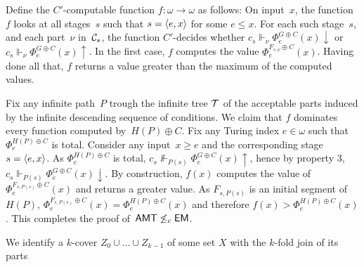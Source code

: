 Define the $C'$-computable function $f : \omega \to \omega$ as follows:
On input~$x$, the function~$f$ looks at all stages~$s$ such that $s = \left\langle e,x \right\rangle$ for
some $e \leq x$. For each such stage~$s$, and each part~$\nu$ in~$\mathcal{C}_s$,
the function $C'$-decides whether $c_s \Vdash_\nu \Phi^{G \oplus C}_e(x) \downarrow$
or $c_s \Vdash_\nu \Phi^{G \oplus C}_e(x) \uparrow$. 
In the first case, $f$ computes the value $\Phi^{F_{s, \nu} \oplus C}_e(x)$.
Having done all that, $f$ returns a value greater than the maximum of the computed values.

Fix any infinite path~$P$ trough the infinite tree $\mathcal{T}$ of the acceptable parts induced
by the infinite descending sequence of conditions. 
We claim that $f$ dominates every function computed by~$H(P) \oplus C$.
Fix any Turing index $e \in \omega$ such that $\Phi_e^{H(P) \oplus C}$ is total.
Consider any input~$x \geq e$ and the corresponding stage $s = \left\langle e,x \right\rangle$. 
As $\Phi_e^{H(P) \oplus C}$ is total, $c_s \not \Vdash_{P(s)} \Phi_e^{G \oplus C}(x) \uparrow$,
hence by property 3, $c_s \Vdash_{P(s)} \Phi_e^{G \oplus C}(x) \downarrow$.
By construction, $f(x)$ computes the value of $\Phi_e^{F_{s,P(s)} \oplus C}(x)$ and returns
a greater value. As $F_{s,P(s)}$ is an initial segment of $H(P)$, 
$\Phi_e^{F_{s,P(s)} \oplus C}(x) = \Phi_e^{H(P) \oplus C}(x)$
and therefore $f(x) > \Phi_e^{H(P) \oplus C}(x)$.
This completes the proof of~$\operatorname{\sf{AMT}} \not \leq_c \operatorname{\sf{EM}}$.

We identify a $k$-cover $Z_0 \cup \dots \cup Z_{k-1}$ of some set $X$ with the $k$-fold join of its parts 
